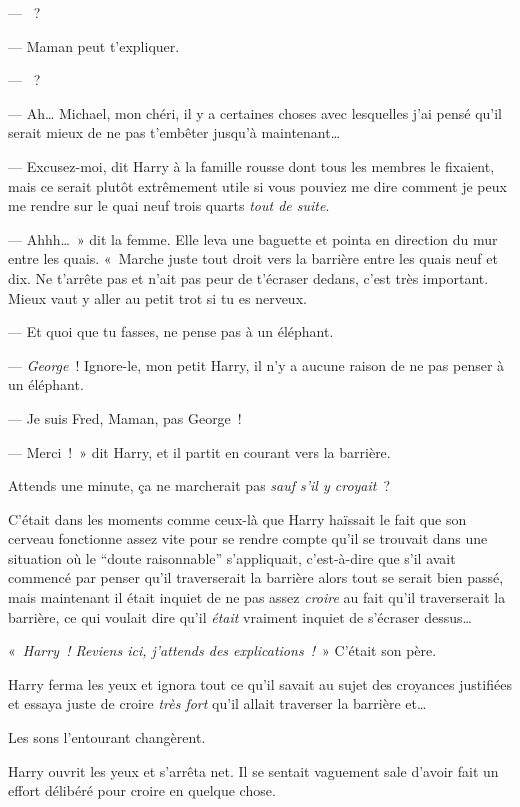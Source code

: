 --- ~?

--- Maman peut t'expliquer.

--- ~?

--- Ah… Michael, mon chéri, il y a certaines choses avec lesquelles j'ai pensé qu'il serait mieux de ne pas t'embêter jusqu'à maintenant…

--- Excusez-moi, dit Harry à la famille rousse dont tous les membres le fixaient, mais ce serait plutôt extrêmement utile si vous pouviez me dire comment je peux me rendre sur le quai neuf trois quarts \emph{tout de suite}.

--- Ahhh…~» dit la femme. Elle leva une baguette et pointa en direction du mur entre les quais. «~Marche juste tout droit vers la barrière entre les quais neuf et dix. Ne t'arrête pas et n'ait pas peur de t'écraser dedans, c'est très important. Mieux vaut y aller au petit trot si tu es nerveux.

--- Et quoi que tu fasses, ne pense pas à un éléphant.

--- \emph{George}~! Ignore-le, mon petit Harry, il n'y a aucune raison de ne pas penser à un éléphant.

--- Je suis Fred, Maman, pas George~!

--- Merci~!~» dit Harry, et il partit en courant vers la barrière.

Attends une minute, ça ne marcherait pas \emph{sauf s'il y croyait}~?

C'était dans les moments comme ceux-là que Harry haïssait le fait que son cerveau fonctionne assez vite pour se rendre compte qu'il se trouvait dans une situation où le “doute raisonnable” s'appliquait, c'est-à-dire que s'il avait commencé par penser qu'il traverserait la barrière alors tout se serait bien passé, mais maintenant il était inquiet de ne pas assez \emph{croire} au fait qu'il traverserait la barrière, ce qui voulait dire qu'il \emph{était} vraiment inquiet de s'écraser dessus…

«~\emph{Harry~! Reviens ici, j'attends des explications~!}~» C'était son père.

Harry ferma les yeux et ignora tout ce qu'il savait au sujet des croyances justifiées et essaya juste de croire \emph{très fort} qu'il allait traverser la barrière et…

Les sons l'entourant changèrent.

Harry ouvrit les yeux et s'arrêta net. Il se sentait vaguement sale d'avoir fait un effort délibéré pour croire en quelque chose.

